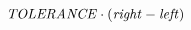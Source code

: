 \documentclass[11pt]{article}
\begin{document}
\[
\mbox{\it TOLERANCE\/} \cdot (\mbox{\it right\/} - \mbox{\it left\/})
\]
\end{document}
